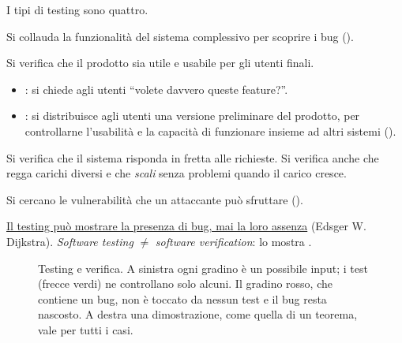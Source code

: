 I tipi di testing sono quattro.
\begin{description}[leftmargin=0pt, style=unboxed]
  \item[Functional testing.] Si collauda la funzionalità del sistema complessivo per scoprire i bug ().
  \item[User testing.] Si verifica che il prodotto sia utile e usabile per gli utenti finali.
    \begin{itemize}
      \item {}: si chiede agli utenti ``volete davvero queste feature?''.
      \item {}: si distribuisce agli utenti una versione preliminare del prodotto, per controllarne
        l'usabilità e la capacità di funzionare insieme ad altri sistemi ().
    \end{itemize}
  \item[Performance e load testing.] Si verifica che il sistema risponda in fretta alle richieste. Si verifica anche
    che regga carichi diversi e che \emph{scali} senza problemi quando il carico cresce.
  \item[Security testing.] Si cercano le vulnerabilità che un attaccante può sfruttare ().
\end{description}

\begin{attenzione}
\uline{Il testing può mostrare la presenza di bug, mai la loro assenza} (Edsger W. Dijkstra). \emph{Software
testing} $\neq$ \emph{software verification}: lo mostra .
\end{attenzione}

\begin{figure}[ht]
\centering
{}
\caption{Testing e verifica. A sinistra ogni gradino è un possibile input; i test (frecce verdi) ne controllano solo
alcuni. Il gradino rosso, che contiene un bug, non è toccato da nessun test e il bug resta nascosto. A destra una
dimostrazione, come quella di un teorema, vale per tutti i casi.}
\label{fig:test-verifica}
\end{figure}

